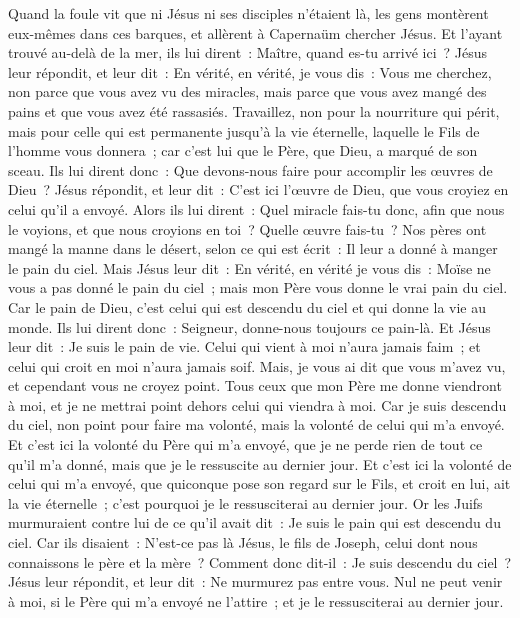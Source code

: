 \begin{multicols}{2}
Quand la foule vit que ni Jésus ni ses disciples n'étaient là, les gens montèrent eux-mêmes dans ces barques, et allèrent à Capernaüm chercher Jésus.
Et l'ayant trouvé au-delà de la mer, ils lui dirent~: Maître, quand es-tu arrivé ici~?
Jésus leur répondit, et leur dit~: En vérité, en vérité, je vous dis~: Vous me cherchez, non parce que vous avez vu des miracles, mais parce que vous avez mangé des pains et que vous avez été rassasiés.
Travaillez, non pour la nourriture qui périt, mais pour celle qui est permanente jusqu'à la vie éternelle, laquelle le Fils de l'homme vous donnera~; car c'est lui que le Père, que Dieu, a marqué de son sceau.
Ils lui dirent donc~: Que devons-nous faire pour accomplir les œuvres de Dieu~?
Jésus répondit, et leur dit~: C'est ici l'œuvre de Dieu, que vous croyiez en celui qu'il a envoyé.
Alors ils lui dirent~: Quel miracle fais-tu donc, afin que nous le voyions, et que nous croyions en toi~? Quelle œuvre fais-tu~?
Nos pères ont mangé la manne dans le désert, selon ce qui est écrit~: Il leur a donné à manger le pain du ciel.
Mais Jésus leur dit~: En vérité, en vérité je vous dis~: Moïse ne vous a pas donné le pain du ciel~; mais mon Père vous donne le vrai pain du ciel.
Car le pain de Dieu, c'est celui qui est descendu du ciel et qui donne la vie au monde.
Ils lui dirent donc~: Seigneur, donne-nous toujours ce pain-là.
Et Jésus leur dit~: Je suis le pain de vie. Celui qui vient à moi n'aura jamais faim~; et celui qui croit en moi n'aura jamais soif.
Mais, je vous ai dit que vous m'avez vu, et cependant vous ne croyez point.
Tous ceux que mon Père me donne viendront à moi, et je ne mettrai point dehors celui qui viendra à moi.
Car je suis descendu du ciel, non point pour faire ma volonté, mais la volonté de celui qui m'a envoyé.
Et c'est ici la volonté du Père qui m'a envoyé, que je ne perde rien de tout ce qu'il m'a donné, mais que je le ressuscite au dernier jour.
Et c'est ici la volonté de celui qui m'a envoyé, que quiconque pose son regard sur le Fils, et croit en lui, ait la vie éternelle~; c'est pourquoi je le ressusciterai au dernier jour.
Or les Juifs murmuraient contre lui de ce qu'il avait dit~: Je suis le pain qui est descendu du ciel.
Car ils disaient~: N'est-ce pas là Jésus, le fils de Joseph, celui dont nous connaissons le père et la mère~? Comment donc dit-il~: Je suis descendu du ciel~?
Jésus leur répondit, et leur dit~: Ne murmurez pas entre vous.
Nul ne peut venir à moi, si le Père qui m'a envoyé ne l'attire~; et je le ressusciterai au dernier jour.

\end{multicols}
